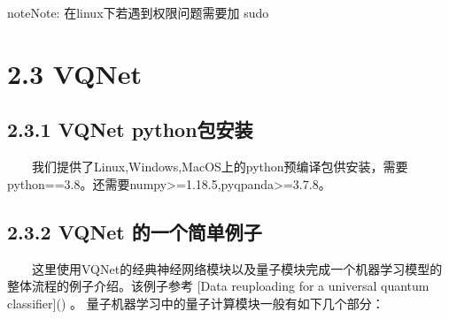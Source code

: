 \documentclass[a4paper,11pt,english]{sphinxmanual}
\begin{document}
\begin{sphinxVerbatim}[commandchars=\\\{\}]
  
\end{sphinxVerbatim}

\begin{sphinxadmonition}{note}{Note:}
\sphinxAtStartPar
在linux下若遇到权限问题需要加 sudo
\end{sphinxadmonition}


\section{2.3 VQNet}
\label{\detokenize{rst/_u9644_u5f552_u91cf_u5b50_u7f16_u7a0b_u5de5_u5177_u7684_u5b89_u88c5_u4e0e_u914d_u7f6e:vqnet}}

\subsection{2.3.1 VQNet python包安装}
\label{\detokenize{rst/_u9644_u5f552_u91cf_u5b50_u7f16_u7a0b_u5de5_u5177_u7684_u5b89_u88c5_u4e0e_u914d_u7f6e:vqnet-python}}
\sphinxAtStartPar
​  我们提供了Linux,Windows,MacOS上的python预编译包供安装，需要python==3.8。还需要numpy>=1.18.5,pyqpanda>=3.7.8。

\begin{sphinxVerbatim}[commandchars=\\\{\}]
  
\end{sphinxVerbatim}

\sphinxAtStartPar
{}

\begin{sphinxVerbatim}[commandchars=\\\{\}]
 
   
  \PYG{p}{[}  \PYG{p}{]}
\end{sphinxVerbatim}


\subsection{2.3.2  VQNet 的一个简单例子}
\label{\detokenize{rst/_u9644_u5f552_u91cf_u5b50_u7f16_u7a0b_u5de5_u5177_u7684_u5b89_u88c5_u4e0e_u914d_u7f6e:id1}}
\sphinxAtStartPar
​  这里使用VQNet的经典神经网络模块以及量子模块完成一个机器学习模型的整体流程的例子介绍。该例子参考 {[}Data re\sphinxhyphen{}uploading for a universal quantum classifier{]}() 。 量子机器学习中的量子计算模块一般有如下几个部分：
\end{document}
